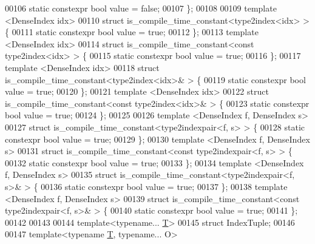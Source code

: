 \begin{DoxyCode}
00106   \textcolor{keyword}{static} constexpr \textcolor{keywordtype}{bool} value = \textcolor{keyword}{false};
00107 \};
00108 
00109 \textcolor{keyword}{template} <DenseIndex \textcolor{keywordtype}{id}x>
00110 \textcolor{keyword}{struct }is\_compile\_time\_constant<type2index<idx> > \{
00111   \textcolor{keyword}{static} constexpr \textcolor{keywordtype}{bool} value = \textcolor{keyword}{true};
00112 \};
00113 \textcolor{keyword}{template} <DenseIndex \textcolor{keywordtype}{id}x>
00114 \textcolor{keyword}{struct }is\_compile\_time\_constant<const type2index<idx> > \{
00115   \textcolor{keyword}{static} constexpr \textcolor{keywordtype}{bool} value = \textcolor{keyword}{true};
00116 \};
00117 \textcolor{keyword}{template} <DenseIndex \textcolor{keywordtype}{id}x>
00118 \textcolor{keyword}{struct }is\_compile\_time\_constant<type2index<idx>& > \{
00119   \textcolor{keyword}{static} constexpr \textcolor{keywordtype}{bool} value = \textcolor{keyword}{true};
00120 \};
00121 \textcolor{keyword}{template} <DenseIndex \textcolor{keywordtype}{id}x>
00122 \textcolor{keyword}{struct }is\_compile\_time\_constant<const type2index<idx>& > \{
00123   \textcolor{keyword}{static} constexpr \textcolor{keywordtype}{bool} value = \textcolor{keyword}{true};
00124 \};
00125 
00126 \textcolor{keyword}{template} <DenseIndex f, DenseIndex s>
00127 \textcolor{keyword}{struct }is\_compile\_time\_constant<type2indexpair<f, s> > \{
00128   \textcolor{keyword}{static} constexpr \textcolor{keywordtype}{bool} value = \textcolor{keyword}{true};
00129 \};
00130 \textcolor{keyword}{template} <DenseIndex f, DenseIndex s>
00131 \textcolor{keyword}{struct }is\_compile\_time\_constant<const type2indexpair<f, s> > \{
00132   \textcolor{keyword}{static} constexpr \textcolor{keywordtype}{bool} value = \textcolor{keyword}{true};
00133 \};
00134 \textcolor{keyword}{template} <DenseIndex f, DenseIndex s>
00135 \textcolor{keyword}{struct }is\_compile\_time\_constant<type2indexpair<f, s>& > \{
00136   \textcolor{keyword}{static} constexpr \textcolor{keywordtype}{bool} value = \textcolor{keyword}{true};
00137 \};
00138 \textcolor{keyword}{template} <DenseIndex f, DenseIndex s>
00139 \textcolor{keyword}{struct }is\_compile\_time\_constant<const type2indexpair<f, s>& > \{
00140   \textcolor{keyword}{static} constexpr \textcolor{keywordtype}{bool} value = \textcolor{keyword}{true};
00141 \};
00142 
00143 
00144 \textcolor{keyword}{template}<\textcolor{keyword}{typename}... \hyperlink{group___sparse_core___module_class_eigen_1_1_triplet}{T}>
00145 \textcolor{keyword}{struct }IndexTuple;
00146 
00147 \textcolor{keyword}{template}<\textcolor{keyword}{typename} \hyperlink{group___sparse_core___module_class_eigen_1_1_triplet}{T}, \textcolor{keyword}{typename}... O>

\end{DoxyCode}
